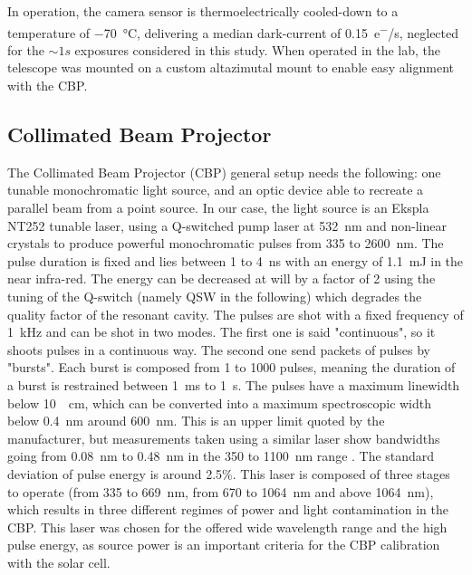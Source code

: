 In operation, the camera sensor is thermoelectrically cooled-down to a
temperature of \SI{-70}{\celsius}, delivering a median dark-current of
\SI{0.15}{e^-/s}, neglected for the $\sim 1s$ exposures considered in
this study. When operated in the lab, the telescope was mounted on a
custom altazimutal mount to enable easy alignment with the CBP.

\subsection{Collimated Beam Projector}
\label{sec:cbp}

The Collimated Beam Projector (CBP) general setup needs the following: one tunable monochromatic light source, and an optic device able to recreate a parallel beam from a point source. 
In our case, the light source is an Ekspla NT252 tunable laser, using a Q-switched pump laser at \SI{532}{\nano\meter} and non-linear crystals to produce powerful monochromatic pulses from 335 to \SI{2600}{\nano\meter}. The pulse duration is fixed and lies between 1 to \SI{4}{\nano\second} with an energy of \SI{1.1}{\milli\joule} in the near infra-red. The energy can be decreased at will by a factor of 2 using the tuning of the Q-switch (namely QSW in the following) which degrades the quality factor of the resonant cavity. The pulses are shot with a fixed frequency of \SI{1}{\kilo\hertz} and can be shot in two modes. The first one is said "continuous", so it shoots pulses in a continuous way. The second one send packets of pulses by "bursts". Each burst is composed from 1 to 1000 pulses, meaning the duration of a burst is restrained between \SI{1}{\milli\second} to \SI{1}{\second}. The pulses have a maximum linewidth below \SI{10}{\per\cm}, which can be converted into a maximum spectroscopic width below \SI{0.4}{\nano\meter} around \SI{600}{\nano\meter}. This is an upper limit quoted by the manufacturer, but measurements taken using a similar laser show bandwidths going from \SI{0.08}{\nm} to \SI{0.48}{\nm} in the 350 to \SI{1100}{\nm} range \citep{woodward2018}. The standard deviation of pulse energy is around 2.5\%. This laser is composed of three stages to operate (from 335 to \SI{669}{\nano\meter}, from 670 to \SI{1064}{\nano\meter} and above \SI{1064}{\nano\meter}), which results in three different regimes of power and light contamination in the CBP. This laser was chosen for the offered wide wavelength range and the high pulse energy, as source power is an important criteria for the CBP calibration with the solar cell. 

